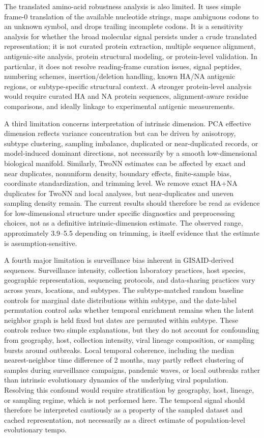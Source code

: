 \documentclass[11pt]{article}
\begin{document}
The translated amino-acid robustness analysis is also limited. It uses simple frame-0 translation of the available nucleotide strings, maps ambiguous codons to an unknown symbol, and drops trailing incomplete codons. It is a sensitivity analysis for whether the broad molecular signal persists under a crude translated representation; it is not curated protein extraction, multiple sequence alignment, antigenic-site analysis, protein structural modeling, or protein-level validation. In particular, it does not resolve reading-frame curation issues, signal peptides, numbering schemes, insertion/deletion handling, known HA/NA antigenic regions, or subtype-specific structural context. A stronger protein-level analysis would require curated HA and NA protein sequences, alignment-aware residue comparisons, and ideally linkage to experimental antigenic measurements.

A third limitation concerns interpretation of intrinsic dimension. PCA effective dimension reflects variance concentration but can be driven by anisotropy, subtype clustering, sampling imbalance, duplicated or near-duplicated records, or model-induced dominant directions, not necessarily by a smooth low-dimensional biological manifold. Similarly, TwoNN estimates can be affected by exact and near duplicates, nonuniform density, boundary effects, finite-sample bias, coordinate standardization, and trimming level. We remove exact HA+NA duplicates for TwoNN and local analyses, but near-duplicates and uneven sampling density remain. The current results should therefore be read as evidence for low-dimensional structure under specific diagnostics and preprocessing choices, not as a definitive intrinsic-dimension estimate. The observed range, approximately 3.9--5.5 depending on trimming, is itself evidence that the estimate is assumption-sensitive.

A fourth major limitation is surveillance bias inherent in GISAID-derived sequences. Surveillance intensity, collection laboratory practices, host species, geographic representation, sequencing protocols, and data-sharing practices vary across years, locations, and subtypes. The subtype-matched random baseline controls for marginal date distributions within subtype, and the date-label permutation control asks whether temporal enrichment remains when the latent neighbor graph is held fixed but dates are permuted within subtype. These controls reduce two simple explanations, but they do not account for confounding from geography, host, collection intensity, viral lineage composition, or sampling bursts around outbreaks. Local temporal coherence, including the median nearest-neighbor time difference of 2 months, may partly reflect clustering of samples during surveillance campaigns, pandemic waves, or local outbreaks rather than intrinsic evolutionary dynamics of the underlying viral population. Resolving this confound would require stratification by geography, host, lineage, or sampling regime, which is not performed here. The temporal signal should therefore be interpreted cautiously as a property of the sampled dataset and cached representation, not necessarily as a direct estimate of population-level evolutionary tempo.
\end{document}
